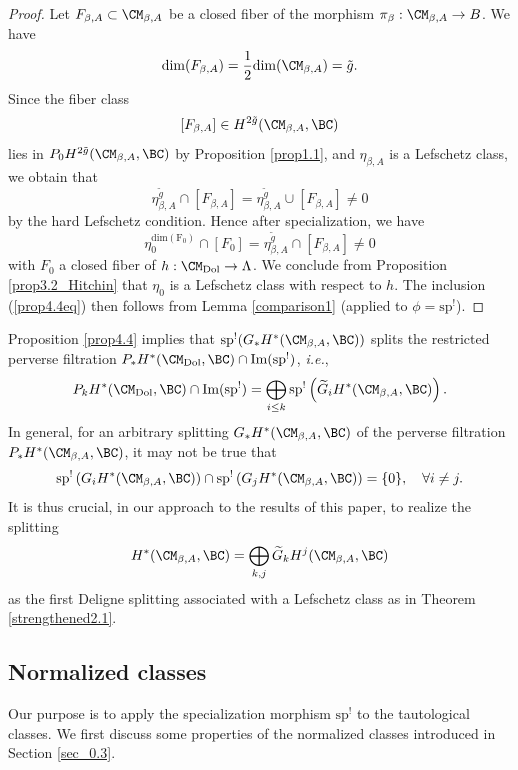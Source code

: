 \begin{proof}
Let $F_{\beta,A} \subset \CM_{\beta,A}$ be a
closed fiber of the morphism $\pi_\beta: \CM_{\beta,A} \to B$. We have
\[
 \mathrm{dim}(F_{\beta,A})= \frac{1}{2}\mathrm{dim}(\CM_{\beta,A}) = \tilde{g}.
\]
Since the fiber class
\[
[F_{\beta,A}] \in H^{2\tilde{g}}(\CM_{\beta,A}, \BC)
\]
lies in $P_0H^{2\tilde{g}}(\CM_{\beta,A}, \BC)$ by Proposition \ref{prop1.1}, and $\eta_{\beta,A}$ is a Lefschetz class, we obtain that
\[
\eta_{\beta,A}^{\tilde{g}}\cap{[F_{\beta,A}]} = \eta_{\beta,A}^{\tilde{g}} \cup [F_{\beta,A}] \neq 0
\]
by the hard Lefschetz condition. Hence after specialization, we have
\[
{\eta_0^{\mathrm{dim(F_0)}}} \cap [F_0]  = \eta_{\beta,A}^{\tilde{g}}\cap{[F_{\beta,A}]} \neq 0
\]
with $F_0$ a closed fiber of $h: \CM_{\mathrm{Dol}} \to \Lambda$. We conclude from Proposition \ref{prop3.2_Hitchin} that $\eta_0$ is a Lefschetz class with respect to $h$. The inclusion  (\ref{prop4.4eq}) then follows from Lemma \ref{comparison1} {(applied to $\phi = \mathrm{sp}^!$)}.
\end{proof}


\begin{rmk}
\notready\label{remark1}
Proposition \ref{prop4.4} implies that $\mathrm{sp}^!(G_*H^*(\CM_{\beta,A}, \BC))$ splits the restricted perverse filtration $P_*H^*(\CM_{\mathrm{Dol}}, \BC) \cap \mathrm{Im(sp^!)}$, \emph{i.e.},
\[
P_kH^*(\CM_{\mathrm{Dol}}, \BC) \cap \mathrm{Im(sp^!)} = \bigoplus_{i\leq k} \mathrm{sp}^!\left( \widetilde{G}_iH^*(\CM_{\beta,A}, \BC)\right).
\]
In general, for an arbitrary splitting $G_*H^*(\CM_{\beta,A}, \BC)$ of the perverse filtration $P_*H^*(\CM_{\beta,A}, \BC)$, it may not be true that
\[
\mathrm{sp}^!\left({G}_iH^*(\CM_{\beta,A}, \BC) \right) \cap \mathrm{sp}^!\left({G}_jH^*(\CM_{\beta,A}, \BC) \right) = \{0\}, \quad \forall i\neq j.
\]
It is thus crucial, in our approach to the results of this paper, to realize the splitting
\[
H^*(\CM_{\beta,A}, \BC) = \bigoplus_{k,j}\widetilde{G}_kH^j(\CM_{\beta,A}, \BC)
\]
as the first  Deligne splitting associated with a Lefschetz class as in Theorem \ref{strengthened2.1}.
\end{rmk}



\subsection{Normalized classes} Our purpose is to apply the specialization morphism $\mathrm{sp}^!$ to the tautological classes. We first discuss some properties of the normalized classes introduced in Section \ref{sec_0.3}.

